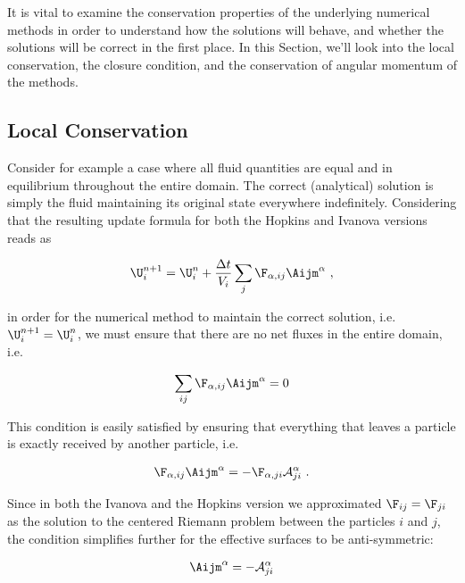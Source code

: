 It is vital to examine the conservation properties of the underlying numerical methods in order to
understand how the solutions will behave, and whether the solutions will be correct in the first
place. In this Section, we'll look into the local conservation, the closure condition, and the
conservation of angular momentum of the methods.





\subsection{Local Conservation}\label{chap:meshless-conservation-local}

Consider for example a case where all fluid quantities are equal and in equilibrium throughout the
entire domain. The correct (analytical) solution is simply the fluid maintaining its original state
everywhere indefinitely. Considering that the resulting update formula for both the Hopkins and
Ivanova versions reads as

\begin{align}
    \U_i^{n+1} = \U_i^n + \frac{\Delta t}{V_i} \sum_j \F_{\alpha, ij} \Aijm^\alpha \ ,
\end{align}

in order for the numerical method to maintain the correct solution, i.e. $\U_i^{n+1} = \U_i^n$, we
must ensure that there are no net fluxes in the entire domain, i.e.

\begin{align}
    \sum_{ij}  \F_{\alpha, ij} \Aijm^\alpha = 0
\end{align}

This condition is easily satisfied by ensuring that everything that leaves a particle is exactly
received by another particle, i.e.

\begin{align}
    \F_{\alpha, ij} \Aijm^\alpha = -\F_{\alpha, ji} \mathcal{A}_{ji}^\alpha \ .
\end{align}

Since in both the Ivanova and the Hopkins version we approximated $\F_{ij} = \F_{ji}$ as the
solution to the centered Riemann problem between the particles $i$ and $j$, the condition
simplifies further for the effective surfaces \Aij to be anti-symmetric:

\begin{align}
    \Aijm^\alpha = -\mathcal{A}_{ji}^\alpha
\end{align}

